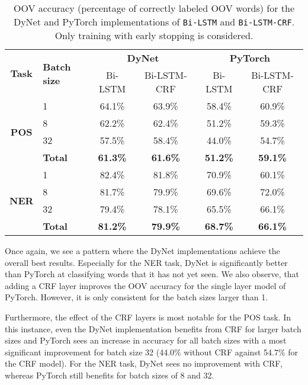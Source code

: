 \begin{table}[h!]
    \centering
    \begin{tabular}{c l c c|c c}
     \toprule
       \multirow{2}{*}{\bfseries Task}
     & \multirow{2}{*}{\bfseries Batch size}
     & \multicolumn{2}{c}{\bfseries DyNet}
     & \multicolumn{2}{c}{\bfseries PyTorch} \\

      \cmidrule(lr){3-6}
     && Bi-LSTM  & Bi-LSTM-CRF & Bi-LSTM  & Bi-LSTM-CRF \\ 

      \cmidrule(lr){1-6}
      \multirow{4}{*}{\textbf{POS}}
      &  1 & 64.1\% & 63.9\%  & 58.4\% & 60.9\%  \\
      &  8 & 62.2\% & 62.4\%  & 51.2\% & 59.3\%  \\
      & 32 & 57.5\% & 58.4\%  & 44.0\% & 54.7\%  \\ \cmidrule(lr){2-6}
      & \textbf{Total} &
      \textbf{61.3\%} & \textbf{61.6\%}  & \textbf{51.2\%} & \textbf{59.1\%} \\

      \cmidrule(lr){1-6}
      \multirow{4}{*}{\textbf{NER}}
     &  1 & 82.4\% & 81.8\%  & 70.9\% & 60.1\%  \\
     &  8 & 81.7\% & 79.9\%  & 69.6\% & 72.0\%  \\
     & 32 & 79.4\% & 78.1\%  & 65.5\% & 66.1\%  \\ \cmidrule(lr){2-6}
     & \textbf{Total} &
      \textbf{81.2\%} & \textbf{79.9\%}  & \textbf{68.7\%} & \textbf{66.1\%} \\

     \bottomrule
    \end{tabular}
    \caption{OOV accuracy (percentage of correctly labeled OOV words) for the DyNet
        and PyTorch implementations of \texttt{Bi-LSTM} and
        \texttt{Bi-LSTM-CRF}. Only training with early stopping is considered. 
    }\label{table:oov-accuracy-total}
\end{table}

Once again, we see a pattern where the DyNet implementations achieve the
overall best results. Especially for the NER task, DyNet is significantly better
than PyTorch at classifying words that it has not yet seen. We also observe,
that adding a CRF layer improves the OOV accuracy for the single layer model of
PyTorch. However, it is only consistent for the batch sizes larger than 1.

Furthermore, the effect of the CRF layers is most notable for the POS task.
In this instance, even the DyNet implementation benefits from CRF for larger
batch sizes and PyTorch sees an increase in accuracy for all batch sizes with a
most significant improvement for batch size 32 (44.0\% without CRF against
54.7\% for the CRF model). For the NER task, DyNet sees no improvement with
CRF, whereas PyTorch still benefits for batch sizes of 8 and 32.

